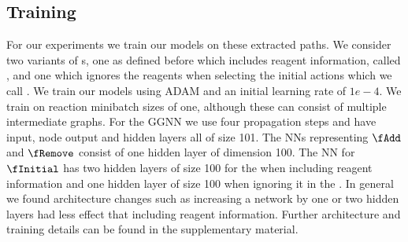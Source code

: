 \subsection{Training}

For our experiments we train our \ourModel models on these extracted paths.
We consider two variants of {\ourModel}s, one as defined before which includes reagent information, called \ourModelR, and one which ignores the reagents when selecting the initial actions which we call \ourModelIR.
We train our models using ADAM \citep{kingma2014adam} and an initial learning rate of $1e-4$.
We train on reaction minibatch sizes of one, although these can consist of multiple intermediate graphs.
For the GGNN we use four propagation steps and have input, node output and hidden layers all of size 101. 
The NNs representing $\fAdd$ and  $\fRemove$ consist of one hidden layer of dimension 100. 
The NN for $\fInitial$ has two hidden layers of size 100 for the \ourModelR when including reagent information and one hidden layer of size 100 when ignoring it in the \ourModelIR. In general we found architecture changes such as increasing a network by one or two hidden layers had less effect that including reagent information.
Further architecture and training details can be found in the supplementary material.